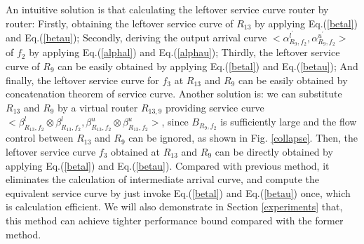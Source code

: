 \documentclass[10pt,journal]{IEEEtran}
\begin{document}
An intuitive solution is that calculating the leftover service curve router by router: Firstly, obtaining the leftover service curve of $R_{13}$ by applying Eq.(\ref{betal}) and Eq.(\ref{betau}); Secondly, deriving the output arrival curve $<\alpha_{R_{9},f_2}^{l^\prime},\alpha_{R_{9},f_2}^{u^\prime}>$ of $f_2$ by applying Eq.(\ref{alphal}) and Eq.(\ref{alphau}); Thirdly, the leftover service curve of $R_9$ can be easily obtained by applying Eq.(\ref{betal}) and Eq.(\ref{betau}); And finally, the leftover service curve for $f_3$ at $R_{13}$ and $R_9$ can be easily obtained by concatenation theorem of service curve. Another solution is: we can substitute $R_{13}$ and $R_{9}$ by a virtual router $R_{13,9}$ providing service curve $<\beta_{R_{13},f_2}^l\otimes\beta_{R_{13},f_2}^l,\beta_{R_{13},f_2}^u\otimes\beta_{R_{13},f_2}^u>$, since $B_{R_9,f_2}$ is sufficiently large and the flow control between $R_{13}$ and $R_9$ can be ignored, as shown in Fig. \ref{collapse}. Then, the leftover service curve $f_3$ obtained at $R_{13}$ and $R_{9}$ can be directly obtained by applying Eq.(\ref{betal}) and Eq.(\ref{betau}). Compared with previous method, it eliminates the calculation of intermediate arrival curve, and compute the equivalent service curve by just invoke Eq.(\ref{betal}) and Eq.(\ref{betau}) once, which is calculation efficient. We will also demonstrate in Section \ref{experiments} that, this method can achieve tighter performance bound compared with the former method.
\end{document}
